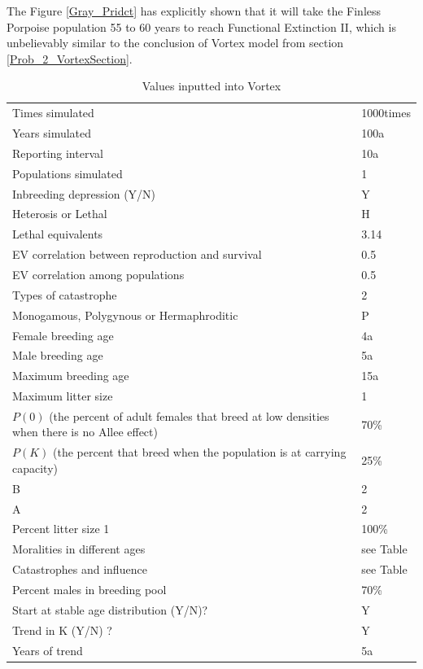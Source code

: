\documentclass{mcmthesis}
\numberwithin{figure}{section}
\numberwithin{table}{section}
\numberwithin{equation}{section}
\begin{document}
The Figure \ref{Gray_Pridct} has explicitly shown that it will take
the Finless Porpoise population 55 to 60 years to reach Functional
Extinction II, which is unbelievably similar to the conclusion of
Vortex model from section \ref{Prob_2_VortexSection}.

\begin{table}[htpb!]
  \centering
  \caption{Values inputted into Vortex\citep{Zhangxianfeng}} \label{Vortex_in}
  \begin{tabular}{m{12.5cm}<{\centering}|m{2.5cm}<{\centering}}
    \toprule[1.5pt]
    Times simulated & 1000times \\
    Years simulated & 100a \\
    Reporting interval &  10a\\
    Populations simulated  & 1\\ 
    Inbreeding depression (Y/N)  & Y \\
    Heterosis or Lethal  & H \\
    Lethal equivalents  &  3.14 \\
    EV correlation between reproduction and survival & 0.5 \\
    EV correlation among populations & 0.5 \\
    Types of catastrophe & 2 \\ 
    Monogamous, Polygynous or Hermaphroditic & P \\
    Female breeding age & 4a\\
    Male breeding age & 5a\\
    Maximum breeding age & 15a\\
    Maximum litter size & 1\\
    $ P(0) $ (the percent 
    of adult females that breed at low densities when there is no Allee effect)  & 70\% \\
    $ P(K) $ (the percent that 
    breed when the population is at carrying capacity) & 25\% \\
    B & 2\\
    A & 2\\
    Percent litter size 1& 100\%\\
    Moralities in different ages & see Table \\%
    Catastrophes and influence & see Table \\%
    Percent males in breeding pool & 70\% \\
    Start at stable age distribution (Y/N)? & Y \\
    Trend in K (Y/N) ? & Y \\
    Years of trend & 5a\\
  \end{tabular}
\end{table}
\end{document}
